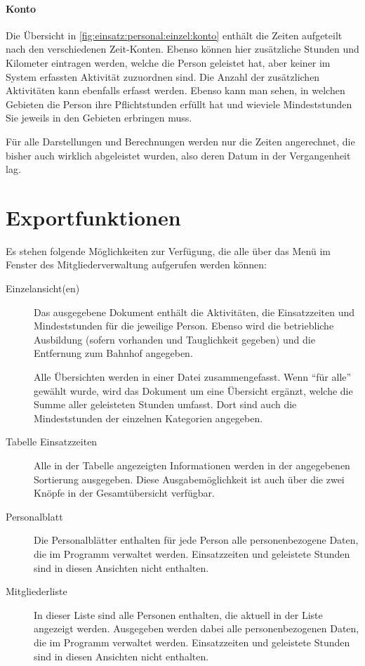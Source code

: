 \paragraph{Konto}
Die Übersicht in \cref{fig:einsatz:personal:einzel:konto} enthält die Zeiten aufgeteilt nach den verschiedenen Zeit-Konten.
Ebenso können hier zusätzliche Stunden und Kilometer eintragen werden,
welche die Person geleistet hat, aber keiner im System erfassten Aktivität zuzuordnen sind.
Die Anzahl der zusätzlichen Aktivitäten kann ebenfalls erfasst werden.
Ebenso kann man sehen, in welchen Gebieten die Person ihre Pflichtstunden erfüllt hat und wieviele Mindeststunden Sie jeweils in den Gebieten erbringen muss.

\begin{hinweis}
  Für alle Darstellungen und Berechnungen werden nur die Zeiten angerechnet, die bisher auch wirklich abgeleistet wurden,
  also deren Datum in der Vergangenheit lag.
\end{hinweis}



\section{Exportfunktionen}
Es stehen folgende Möglichkeiten zur Verfügung,
die alle über das Menü  im Fenster des Mitgliederverwaltung aufgerufen werden können:
\begin{description}
  \item[Einzelansicht(en)]
  Das ausgegebene Dokument enthält die Aktivitäten, die Einsatzzeiten und Mindeststunden für die jeweilige Person.
  Ebenso wird die betriebliche Ausbildung (sofern vorhanden und Tauglichkeit gegeben) und die Entfernung zum Bahnhof angegeben.

  Alle Übersichten werden in einer Datei zusammengefasst.
  Wenn \enquote{für alle} gewählt wurde,
  wird das Dokument um eine Übersicht ergänzt,
  welche die Summe aller geleisteten Stunden umfasst.
  Dort sind auch die Mindeststunden der einzelnen Kategorien angegeben.

  \item[Tabelle Einsatzzeiten]
  Alle in der Tabelle angezeigten Informationen werden in der angegebenen Sortierung ausgegeben.
  Diese Ausgabemöglichkeit ist auch über die zwei Knöpfe in der Gesamtübersicht verfügbar.

  \item[Personalblatt]
  Die Personalblätter enthalten für jede Person alle personenbezogene Daten,
  die im Programm verwaltet werden.
  Einsatzzeiten und geleistete Stunden sind in diesen Ansichten nicht enthalten.

  \item[Mitgliederliste]
  In dieser Liste sind alle Personen enthalten, die aktuell in der Liste angezeigt werden.
  Ausgegeben werden dabei alle personenbezogenen Daten,
  die im Programm verwaltet werden.
  Einsatzzeiten und geleistete Stunden sind in diesen Ansichten nicht enthalten.

\end{description}
